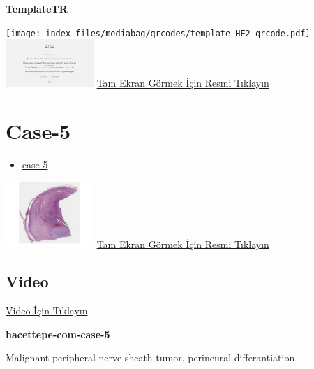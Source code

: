 \documentclass[
  letterpaper,
  DIV=11,
  numbers=noendperiod]{scrreprt}
\providecommand{\tightlist}{%
  \setlength{\itemsep}{0pt}\setlength{\parskip}{0pt}}\usepackage{longtable,booktabs,array}
\begin{document}
\textbf{TemplateTR}

\texttt{[image: index\_files/mediabag/qrcodes/template-HE2\_qrcode.pdf]}
\href{https://images.patolojiatlasi.com/template/HE2.html}{\includegraphics[width=0.25\textwidth,height=\textheight]{./screenshots/thumbnail_template-HE2.png}}
\href{https://images.patolojiatlasi.com/template/HE2.html}{Tam Ekran
Görmek İçin Resmi Tıklayın}

\hypertarget{sec-hacettepe-case-of-the-month-case-5}{%
\section{Case-5}\label{sec-hacettepe-case-of-the-month-case-5}}

\begin{itemize}
\tightlist
\item
  \href{https://www.youtube.com/watch?v=o13qcP56mqg&ab_channel=KemalKosemehmetoglu}{case
  5}
\end{itemize}

\href{https://images.patolojiatlasi.com/hacettepe-com-case-5/HE.html}{\includegraphics[width=0.25\textwidth,height=\textheight]{./screenshots/thumbnail_hacettepe-com-case-5.png}}
\href{https://images.patolojiatlasi.com/hacettepe-com-case-5/HE.html}{Tam
Ekran Görmek İçin Resmi Tıklayın}

\hypertarget{video-4}{%
\subsection{Video}\label{video-4}}

\href{https://www.youtube.com/watch?v=o13qcP56mqg}{Video İçin Tıklayın}

\textbf{hacettepe-com-case-5}

\begin{tcolorbox}[enhanced jigsaw, breakable, opacitybacktitle=0.6, arc=.35mm, colbacktitle=quarto-callout-tip-color!10!white, colback=white, toptitle=1mm, left=2mm, opacityback=0, colframe=quarto-callout-tip-color-frame, titlerule=0mm, rightrule=.15mm, bottomrule=.15mm, toprule=.15mm, bottomtitle=1mm, title=\textcolor{quarto-callout-tip-color}{\faLightbulb}\hspace{0.5em}{Tanı}, coltitle=black, leftrule=.75mm]

Malignant peripheral nerve sheath tumor, perineural differantiation

\end{tcolorbox}
\end{document}
